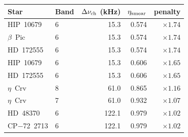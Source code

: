 \begin{tabular}{@{}llrrr@{}}
\toprule
Star & Band & $\Delta\nu_{\rm ch}$ (kHz) & $\eta_{\rm smear}$ & penalty \\
\midrule
HIP~10679 & 6 & 15.3 & 0.574 & $\times1.74$ \\
$\beta$~Pic & 6 & 15.3 & 0.574 & $\times1.74$ \\
HD~172555 & 6 & 15.3 & 0.574 & $\times1.74$ \\
HIP~10679 & 6 & 15.3 & 0.606 & $\times1.65$ \\
HD~172555 & 6 & 15.3 & 0.606 & $\times1.65$ \\
$\eta$~Crv & 8 & 61.0 & 0.865 & $\times1.16$ \\
$\eta$~Crv & 7 & 61.0 & 0.932 & $\times1.07$ \\
HD~48370 & 6 & 122.1 & 0.979 & $\times1.02$ \\
CP$-$72~2713 & 6 & 122.1 & 0.979 & $\times1.02$ \\
\bottomrule
\end{tabular}

